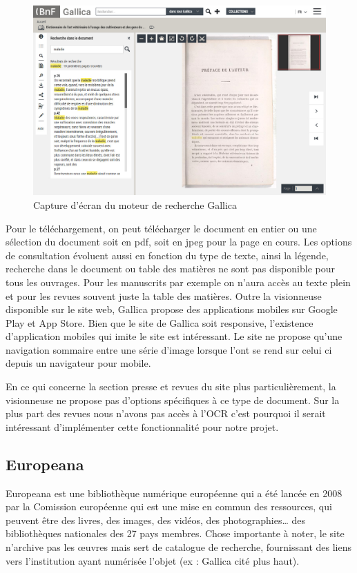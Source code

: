         \begin{figure}[h!]
            \centering
            \includegraphics[width=1\textwidth]{figure/screenshot_gallica.jpg}
            \caption{Capture d'écran du moteur de recherche Gallica}
            \label{fig:gallica}
        \end{figure}

        Pour le téléchargement, on peut télécharger le document en entier ou une sélection du document soit en pdf,
        soit en jpeg pour la page en cours. Les options de consultation évoluent aussi en fonction du type de texte,
        ainsi la légende, recherche dans le document ou table des matières ne sont pas disponible pour tous les ouvrages.
        Pour les manuscrits par exemple on n’aura accès au texte plein et pour les revues souvent juste la table des matières.
        Outre la visionneuse disponible sur le site web, Gallica propose des applications mobiles sur Google Play et App Store.
        Bien que le site de Gallica soit responsive, l'existence d’application mobiles qui imite le site est intéressant.
        Le site ne propose qu’une navigation sommaire entre une série d’image lorsque l’ont se rend sur celui ci depuis un navigateur pour mobile.

        En ce qui concerne la section presse et revues du site plus particulièrement, la visionneuse ne propose
        pas d’options spécifiques à ce type de document. Sur la plus part des revues nous n’avons pas accès à l’OCR
        c’est pourquoi il serait intéressant d’implémenter cette fonctionnalité pour notre projet.

        \subsection{Europeana}
        \label{sec:europeana}
        Europeana est une bibliothèque numérique européenne qui a été lancée en 2008 par la Comission européenne qui est une mise en commun des ressources,
        qui peuvent être des livres, des images, des vidéos, des photographies… des bibliothèques nationales des 27 pays membres. Chose importante à noter,
        le site n’archive pas les œuvres mais sert de catalogue de recherche, fournissant des liens vers l’institution ayant numérisée l’objet 
        (ex : Gallica cité plus haut).

